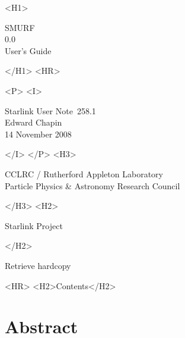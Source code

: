 \documentclass[twoside,11pt]{article}
\newcommand{\stardoccategory}  {Starlink User Note}
\newcommand{\stardocsource}    {sun\stardocnumber}
\newcommand{\stardocnumber}    {258.1}
\newcommand{\stardocauthors}   {Edward Chapin}
\newcommand{\stardocdate}      {14 November 2008}
\newcommand{\stardoctitle}     {SMURF}
\newcommand{\stardocversion}   {0.0}
\newcommand{\stardocmanual}    {User's Guide}
\newcommand{\htmladdnormallink}[2]{#1}
\newcommand{\htmladdimg}[1]{}
\newcommand{\htmlref}[2]{#1}
\newcommand{\htmladdtonavigation}[1]{}
\newcommand{\xlabel}[1]{}
\renewcommand{\_}{\texttt{\symbol{95}}}
\begin{document}
\begin{htmlonly}
   \xlabel{}
   \begin{rawhtml} <H1> \end{rawhtml}
      \stardoctitle\\
      \stardocversion\\
      \stardocmanual
   \begin{rawhtml} </H1> <HR> \end{rawhtml}


   \begin{rawhtml} <P> <I> \end{rawhtml}
   \stardoccategory\ \stardocnumber \\
   \stardocauthors \\
   \stardocdate
   \begin{rawhtml} </I> </P> <H3> \end{rawhtml}
      \htmladdnormallink{CCLRC / Rutherford Appleton Laboratory}
                        {http://www.cclrc.ac.uk} \\
      \htmladdnormallink{Particle Physics \& Astronomy Research Council}
                        {http://www.pparc.ac.uk} \\
   \begin{rawhtml} </H3> <H2> \end{rawhtml}
      \htmladdnormallink{Starlink Project}{http://www.starlink.rl.ac.uk/}
   \begin{rawhtml} </H2> \end{rawhtml}
   \htmladdnormallink{\htmladdimg{source.gif} Retrieve hardcopy}
      {http://www.starlink.rl.ac.uk/cgi-bin/hcserver?\stardocsource}\\

  \label{stardoccontents}
  \begin{rawhtml} 
    <HR>
    <H2>Contents</H2>
  \end{rawhtml}
  \htmladdtonavigation{\htmlref{\htmladdimg{contents_motif.gif}}
        {stardoccontents}}

  \section{\xlabel{abstract}Abstract}
\end{htmlonly}
\end{document}

